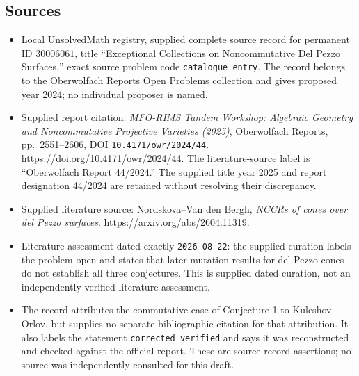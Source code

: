 \documentclass[11pt]{article}
\begin{document}
\subsection{Sources}
\begin{itemize}
\item Local UnsolvedMath registry, supplied complete source record for permanent ID \(30006061\), title ``Exceptional Collections on Noncommutative Del Pezzo Surfaces,'' exact source problem code \texttt{catalogue entry}. The record belongs to the Oberwolfach Reports Open Problems collection and gives proposed year 2024; no individual proposer is named.
\item Supplied report citation: \emph{MFO-RIMS Tandem Workshop: Algebraic Geometry and Noncommutative Projective Varieties (2025)}, Oberwolfach Reports, pp.\ 2551--2606, DOI \texttt{10.4171/owr/2024/44}. \url{https://doi.org/10.4171/owr/2024/44}. The literature-source label is ``Oberwolfach Report 44/2024.'' The supplied title year 2025 and report designation 44/2024 are retained without resolving their discrepancy.
\item Supplied literature source: Nordskova--Van den Bergh, \emph{NCCRs of cones over del Pezzo surfaces}. \url{https://arxiv.org/abs/2604.11319}.
\item Literature assessment dated exactly \texttt{2026-08-22}: the supplied curation labels the problem open and states that later mutation results for del Pezzo cones do not establish all three conjectures. This is supplied dated curation, not an independently verified literature assessment.
\item The record attributes the commutative case of Conjecture 1 to Kuleshov--Orlov, but supplies no separate bibliographic citation for that attribution. It also labels the statement \texttt{corrected\_verified} and says it was reconstructed and checked against the official report. These are source-record assertions; no source was independently consulted for this draft.
\end{itemize}
\end{document}

